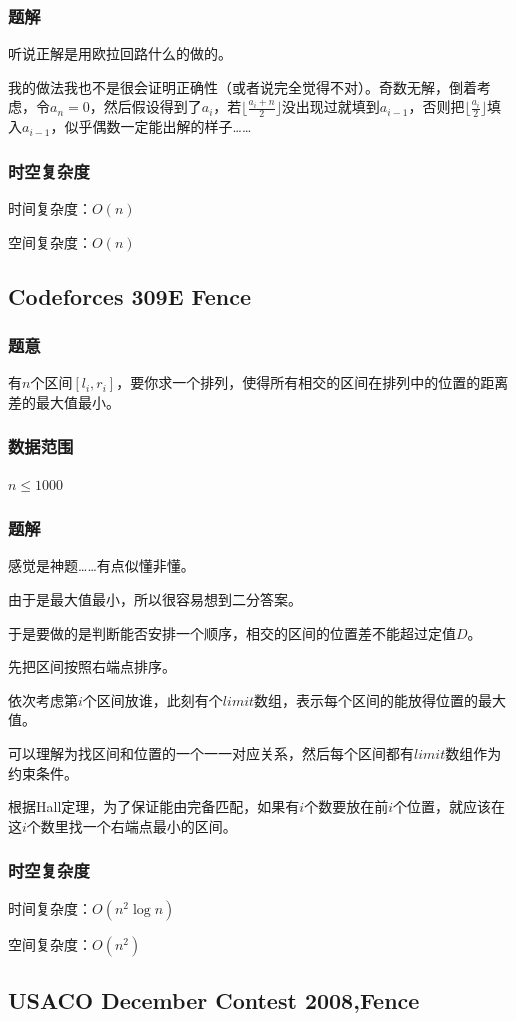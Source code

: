\documentclass{ctexart}
\begin{document}
\subsubsection{题解}
听说正解是用欧拉回路什么的做的。

我的做法我也不是很会证明正确性（或者说完全觉得不对）。奇数无解，倒着考虑，令$a_n=0$，然后假设得到了$a_i$，若$\lfloor \frac{a_i+n}{2} \rfloor$没出现过就填到$a_{i-1}$，否则把$\lfloor \frac{a_i}{2} \rfloor$填入$a_{i-1}$，似乎偶数一定能出解的样子……
\subsubsection{时空复杂度}
时间复杂度：$O(n)$

空间复杂度：$O(n)$
\subsection{Codeforces 309E Fence}
\subsubsection{题意}
有$n$个区间$[l_i,r_i]$，要你求一个排列，使得所有相交的区间在排列中的位置的距离差的最大值最小。
\subsubsection{数据范围}
$n \le 1000$
\subsubsection{题解}
感觉是神题……有点似懂非懂。

由于是最大值最小，所以很容易想到二分答案。

于是要做的是判断能否安排一个顺序，相交的区间的位置差不能超过定值$D$。

先把区间按照右端点排序。

依次考虑第$i$个区间放谁，此刻有个$limit$数组，表示每个区间的能放得位置的最大值。

可以理解为找区间和位置的一个一一对应关系，然后每个区间都有$limit$数组作为约束条件。

根据Hall定理，为了保证能由完备匹配，如果有$i$个数要放在前$i$个位置，就应该在这$i$个数里找一个右端点最小的区间。
\subsubsection{时空复杂度}
时间复杂度：$O(n^2 \log n)$

空间复杂度：$O(n^2)$
\subsection{USACO December Contest 2008,Fence}
\end{document}
